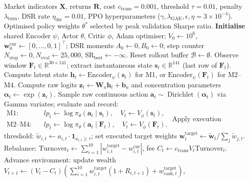 \begin{algorithm}[H]
\caption{Continuous Dirichlet PPO Daily Portfolio Allocation}\label{alg:ppo}
\small
\begin{algorithmic}[1]
\Require Market indicators $\mathbf{X}$, returns $\mathbf{R}$, cost $c_{\text{trans}} = 0.001$, threshold $\tau = 0.01$, penalty $\lambda_{\text{turn}}$, DSR rate $\eta_{\text{dsr}} = 0.01$, PPO hyperparameters ($\gamma, \lambda_{\text{GAE}}, \epsilon, \eta = 3 \times 10^{-4}$).
\Ensure Optimised policy weights $\theta^*$ selected by peak validation Sharpe ratio.
\State \textbf{Initialise} shared Encoder $\psi$, Actor $\theta$, Critic $\phi$, Adam optimiser; $V_0 \gets 10^6$, $\mathbf{w}_0^{\text{cur}} \gets [0,\dots,0,1]^\top$; DSR moments $A_0 \gets 0, B_0 \gets 0$; step counter $N_{\text{step}} \gets 0, N_{\text{eval}} \gets 25{,}000$, $\text{SR}_{\text{best}} \gets -\infty$.
 
  \State Reset rollout buffer $\mathcal{B} \gets \emptyset$.
    \State Observe window $\mathbf{F}_t \in \mathbb{R}^{30 \times 141}$; extract instantaneous state $\mathbf{s}_t \in \mathbb{R}^{141}$ (last row of $\mathbf{F}_t$).
    \State Compute latent state $\mathbf{h}_t \gets \text{Encoder}_\psi(\mathbf{s}_t)$ for M1, or $\text{Encoder}_\psi(\mathbf{F}_t)$ for M2--M4.
    \State Compute raw logits $\mathbf{z}_t \gets \mathbf{W}_a \mathbf{h}_t + \mathbf{b}_a$ and concentration parameters $\boldsymbol{\alpha}_t \gets \exp(\mathbf{z}_t)$.
    \State Sample raw continuous action $\mathbf{a}_t \sim \operatorname{Dirichlet}(\boldsymbol{\alpha}_t)$ via Gamma variates; evaluate and record:
    \State \quad $\begin{aligned}
    \text{M1:}\quad &lp_t \gets \log\pi_\theta(\mathbf{a}_t \mid \mathbf{s}_t), \quad V_t \gets V_\phi(\mathbf{s}_t),\\
    \text{M2--M4:}\quad &lp_t \gets \log\pi_\theta(\mathbf{a}_t \mid \mathbf{F}_t), \quad V_t \gets V_\phi(\mathbf{F}_t).
    \end{aligned}$
    \State Apply execution threshold: $\widetilde{w}_{i,t} \gets a_{i,t} \cdot \mathbf{1}_{a_{i,t} \ge \tau}$; set executed target weights $\mathbf{w}_t^{\text{target}} \gets \widetilde{\mathbf{w}}_t / \sum_j \widetilde{w}_{j,t}$.
    \State Rebalance: $\text{Turnover}_t \gets \sum_{i=1}^{10} |w_{i,t}^{\text{target}} - w_{i,t}^{\text{cur}}|$, fee $C_t \gets c_{\text{trans}} V_t \text{Turnover}_t$.
    \State Advance environment: update wealth $V_{t+1} \gets (V_t - C_t) \left(\sum_{i=1}^{10} w_{i,t}^{\text{target}}(1+R_{i,t+1}) + w_{\text{cash},t}^{\text{target}}\right)$,

\end{algorithmic}
\end{algorithm}
